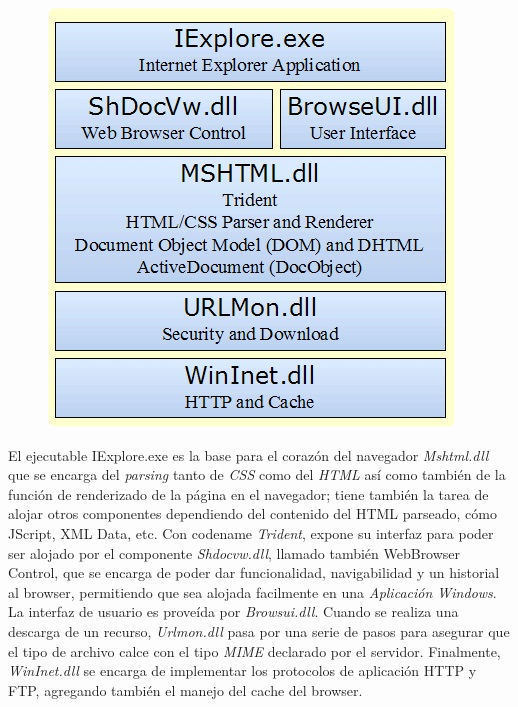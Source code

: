     \begin{figure}[h!t]
        \begin{center}
    		\includegraphics[scale=0.65]{figures/IEArch.jpg}
          \label{fig:archIE}
        \end{center}
    \end{figure}
      
    El ejecutable IExplore.exe es la base para el corazón del navegador \textit{Mshtml.dll} que se encarga del \textit{parsing} tanto de \textit{CSS} como del \textit{HTML} así como también de la función de renderizado de la página en el navegador; tiene también la tarea de alojar otros componentes dependiendo del contenido del HTML parseado, cómo JScript, XML Data, etc. Con codename \textit{Trident}, expone su interfaz para poder ser alojado por el componente \textit{Shdocvw.dll}, llamado también WebBrowser Control, que se encarga de poder dar funcionalidad, navigabilidad y un historial al browser, permitiendo que sea alojada facilmente en una \textit{Aplicación Windows}. La interfaz de usuario es proveída por \textit{Browsui.dll}. Cuando se realiza una descarga de un recurso, \textit{Urlmon.dll} pasa por una serie de pasos para asegurar que el tipo de archivo calce con el tipo \textit{MIME} declarado por el servidor. Finalmente, \textit{WinInet.dll} se encarga de implementar los protocolos de aplicación HTTP y FTP, agregando también el manejo del cache del browser.
            

